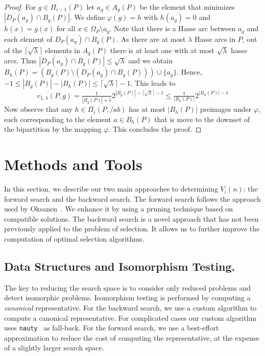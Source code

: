 \documentclass[a4paper,UKenglish,cleveref, autoref, thm-restate]{lipics-v2021}
\newcommand{\less}[2]{D_{#1}(#2)}
\begin{document}
\begin{proof}
  For $g \in \Pi_{i-1}(P)$ let $a_g \in A_g(P)$ be the element that minimizes $|\less{P}{a_g} \cap B_g(P)|$.
  We define $\varphi(g) = h$ with $h(a_g) = 0$ and $h(x) = g(x)$ for all $x \in \Omega_P \setminus a_g$.
  Note that there is a Hasse arc between $a_g$ and each element of $\less{P}{a_g} \cap B_g(P)$.
  As there are at most $\lambda$ Hasse arcs in $P$, out of the $\lceil\sqrt\lambda\rceil$ elements in $A_g(P)$ there is at least one with at most $\sqrt\lambda$ hasse arcs.
  Thus $|\less{P}{a_g} \cap B_g(P)| \le \sqrt\lambda$ and we obtain $B_h(P) = (B_g(P) \setminus (\less{P}{a_g} \cap B_g(P))) \cup \{ a_g \}$.
  Hence, $-1 \le |B_g(P)| - |B_h(P)| \le \lceil\sqrt\lambda\rceil - 1$.
  This leads to
  \begin{equation*}
    v_{1,\lambda}(P, g) = \tfrac{1}{|B_g(P)| + 1}2^{|B_g(P)| - \lceil\sqrt {\lambda} \rceil - 1} \le \tfrac{1}{|B_h(P)|}2^{|B_h(P)| - 1}
  \end{equation*}
  Now observe that any $h \in \Pi_i(P, /ab)$ has at most $|B_h(P)|$ preimages under $\varphi$, each corresponding to the element $a \in B_h(P)$ that is move to the downset of the bipartition by the mapping $\varphi$.
  This concludes the proof.
\end{proof}


\section{Methods and Tools}

In this section, we describe our two main approaches to determining $V_i(n)$: the forward search and the backward search.
The forward search follows the approach used by Oksanen~\cite{Oksanen2006}.
We enhance it by using a pruning technique based on compatible solutions.
The backward search is a novel approach that has not been previously applied to the problem of selection.
It allows us to further improve the computation of optimal selection algorithms.%

\subsection{Data Structures and Isomorphism Testing.}
The key to reducing the search space is to consider only reduced problems and detect isomorphic problems.
Isomorphism testing is performed by computing a \emph{canonical} representative.
For the backward search, we use a custom algorithm to compute a canonical representative.
For complicated cases our custom algorithm uses \texttt{nauty}~\cite{MCKAY201494} as fall-back.
For the forward search, we use a best-effort approximation to reduce the cost of computing the representative, at the expense of a slightly larger search space.
\end{document}
